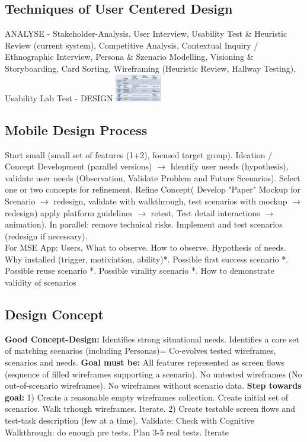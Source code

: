 \subsection{Techniques of User Centered Design}
ANALYSE - Stakeholder-Analysis, User Interview, Usability Test \& Heuristic Review (current system), Competitive Analysis, Contextual Inquiry / Ethnographic Interview, Persona \& Szenario Modelling, Visioning \& Storyboarding, Card Sorting, Wireframing (Heuristic Review, Hallway Testing), Usability Lab Test - DESIGN
\includegraphics[width=0.15\textwidth]{techniques.png}

\subsection{Mobile Design Process}
Start small (small set of features (1+2), focused target group). Ideation / Concept Development (parallel versions) $\rightarrow$ Identify user needs (hypothesis), validate user needs (Observation, Validate Problem and Future Scenarios). Select one or two concepts for refinement. Refine Concept( Develop "Paper" Mockup for Scenario $\rightarrow$ redesign, validate with walkthrough, test scenarios with mockup $\rightarrow$ redesign) apply platform guidelines $\rightarrow$ retest, Test detail interactions $\rightarrow$ animation). In parallel: remove technical risks. Implement and test scenarios (redesign if necessary).\\
For MSE App: Users, What to observe. How to observe. Hypothesis of needs. Why installed (trigger, motiviation, ability)*. Possible first success scenario *. Possible reuse scenario *. Possible virality scenario *. How to demonstrate validity of scenarios

\subsection{Design Concept}
\textbf{Good Concept-Design:}
Identifies strong situational needs. Identifies a core set of matching scenarios (including Personas)=
Co-evolves tested wireframes, scenarios and needs.
\textbf{Goal must be:}
All features represented as screen flows (sequence of filled wireframes supporting a scenario).
No untested wireframes (No out-of-scenario wireframes). No wireframes without scenario data.
\textbf{Step towards goal:}
1) Create a reasonable empty wireframes collection. Create initial set of scenarios. Walk trhough wireframes. Iterate.
2) Create testable screen flows and test-task description (few at a time).
Validate: Check with Cognitive Walkthrough: do enough pre tests. Plan 3-5 real tests. Iterate

